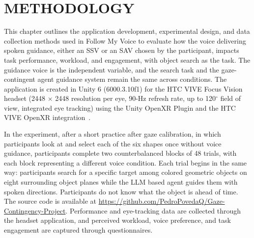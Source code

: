 \chapter{METHODOLOGY}
\label{ch:system}
This chapter outlines the application development, experimental design, and data collection methods used in Follow My Voice to evaluate how the voice delivering spoken guidance, either an SSV or an SAV chosen by the participant, impacts task performance, workload, and engagement, with object search as the task. The guidance voice is the independent variable, and the search task and the gaze-contingent agent guidance system remain the same across conditions. The application is created in Unity 6 (6000.3.10f1) for the HTC VIVE Focus Vision headset (2448 $\times$ 2448 resolution per eye, 90-Hz refresh rate, up to 120$^\circ$ field of view, integrated eye tracking) using the Unity OpenXR Plugin and the HTC VIVE OpenXR integration~\cite{htc2026focusvision}.

In the experiment, after a short practice after gaze calibration, in which participants look at and select each of the six shapes once without voice guidance, participants complete two counterbalanced blocks of 48 trials, with each block representing a different voice condition. Each trial begins in the same way: participants search for a specific target among colored geometric objects on eight surrounding object planes while the LLM based agent guides them with spoken directions. Participants do not know what the object is ahead of time. The source code is available at \url{https://github.com/PedroPovedaQ/Gaze-Contingency-Project}. Performance and eye-tracking data are collected through the headset application, and perceived workload, voice preference, and task engagement are captured through questionnaires.

